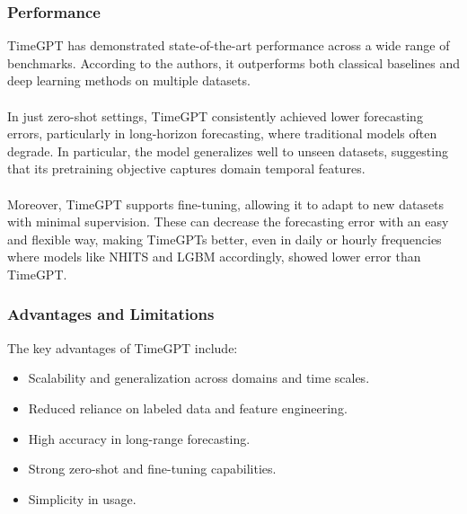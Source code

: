 \documentclass{article}
\begin{document}
\newpage
\subsubsection{Performance}
TimeGPT has demonstrated state-of-the-art performance across a wide range of benchmarks. According to the authors, it outperforms both classical baselines and deep learning methods on multiple datasets.\\
\\
In just zero-shot settings, TimeGPT consistently achieved lower forecasting errors, particularly in long-horizon forecasting, where traditional models often degrade. In particular, the model generalizes well to unseen datasets, suggesting that its pretraining objective captures domain temporal features.\\
\\
Moreover, TimeGPT supports fine-tuning, allowing it to adapt to new datasets with minimal supervision. These can decrease the forecasting error with an easy and flexible way, making TimeGPTs better, even in daily or hourly frequencies where models like NHITS and LGBM accordingly, showed lower error than TimeGPT.

\subsubsection{Advantages and Limitations}
The key advantages of TimeGPT include:

\begin{itemize}
    \item Scalability and generalization across domains and time scales.
\end{itemize}

\begin{itemize}
    \item Reduced reliance on labeled data and feature engineering.
\end{itemize}

\begin{itemize}
    \item High accuracy in long-range forecasting.
\end{itemize}

\begin{itemize}
    \item Strong zero-shot and fine-tuning capabilities.
\end{itemize}

\begin{itemize}
    \item Simplicity in usage.
\end{itemize}
\end{document}
